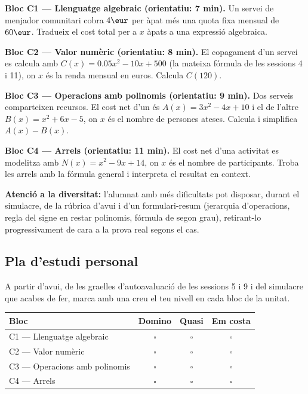 \begin{exercicis}
\begin{exlist}
  \item \textbf{Bloc C1 — Llenguatge algebraic (orientatiu: 7 min).} Un
        servei de menjador comunitari cobra $4\eur$ per àpat més una
        quota fixa mensual de $60\eur$. Tradueix el cost total per a $x$
        àpats a una expressió algebraica.

  \item \textbf{Bloc C2 — Valor numèric (orientatiu: 8 min).} El
        copagament d'un servei es calcula amb
        $C(x)=\num{0,05}x^2-10x+500$ (la mateixa fórmula de les sessions
        4 i 11), on $x$ és la renda mensual en euros. Calcula $C(120)$.

  \item \textbf{Bloc C3 — Operacions amb polinomis (orientatiu: 9
        min).} Dos serveis comparteixen recursos. El cost net d'un és
        $A(x)=3x^2-4x+10$ i el de l'altre $B(x)=x^2+6x-5$, on $x$ és el
        nombre de persones ateses. Calcula i simplifica $A(x)-B(x)$.

  \item \textbf{Bloc C4 — Arrels (orientatiu: 11 min).} El cost net
        d'una activitat es modelitza amb $N(x)=x^2-9x+14$, on $x$ és el
        nombre de participants. Troba les arrels amb la fórmula general
        i interpreta el resultat en context.

\textbf{Atenció a la diversitat:} l'alumnat amb més dificultats pot
disposar, durant el simulacre, de la rúbrica d'avui i d'un
formulari-resum (jerarquia d'operacions, regla del signe en restar
polinomis, fórmula de segon grau), retirant-lo progressivament de cara a
la prova real segons el cas.
\end{exlist}
\end{exercicis}

\subsection*{Pla d'estudi personal}

\noindent A partir d'avui, de les graelles d'autoavaluació de les
sessions 5 i 9 i del simulacre que acabes de fer, marca amb una creu el
teu nivell en cada bloc de la unitat.

\begin{center}
\renewcommand{\arraystretch}{1.4}
\begin{tabular}{|p{7.2cm}|c|c|c|}
\hline
\textbf{Bloc} & \textbf{Domino} & \textbf{Quasi} & \textbf{Em costa} \\
\hline
C1 — Llenguatge algebraic & $\square$ & $\square$ & $\square$ \\
\hline
C2 — Valor numèric & $\square$ & $\square$ & $\square$ \\
\hline
C3 — Operacions amb polinomis & $\square$ & $\square$ & $\square$ \\
\hline
C4 — Arrels & $\square$ & $\square$ & $\square$ \\
\hline
\end{tabular}
\end{center}

